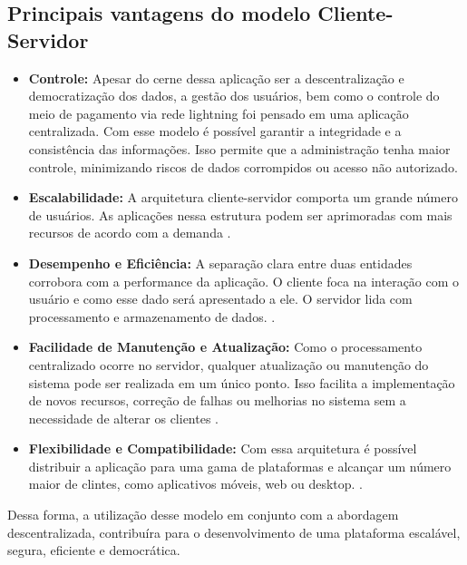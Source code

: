 \subsection{Principais vantagens do modelo Cliente-Servidor}

\begin{itemize}
    \item \textbf{Controle:} Apesar do cerne dessa aplicação ser a descentralização e democratização dos dados, a gestão dos usuários, bem como o controle do meio de pagamento via rede lightning foi pensado em uma aplicação centralizada. Com esse modelo é possível garantir a integridade e a consistência das informações. 
    Isso permite que a administração tenha maior controle, minimizando riscos de dados corrompidos ou acesso não autorizado\cite{coulouris2011}.
    
    \item \textbf{Escalabilidade:} A arquitetura cliente-servidor comporta um grande número de usuários. As aplicações nessa estrutura podem ser aprimoradas com mais recursos de acordo com a demanda \cite{coulouris2011}.
    
    \item \textbf{Desempenho e Eficiência:} A separação clara entre duas entidades corrobora com a performance da aplicação. O cliente foca na interação com o usuário e como esse dado será apresentado a ele. O servidor lida com processamento e armazenamento de dados. \cite{coulouris2011}.
    
    \item \textbf{Facilidade de Manutenção e Atualização:} Como o processamento centralizado ocorre no servidor, qualquer atualização ou manutenção do sistema pode ser realizada em um único ponto. Isso facilita a implementação de novos recursos, correção de falhas ou melhorias no sistema sem a necessidade de alterar os clientes \cite{coulouris2011}.
    
    \item \textbf{Flexibilidade e Compatibilidade:} Com essa arquitetura é possível distribuir a aplicação para uma gama de plataformas e alcançar um número maior de clintes, como aplicativos móveis, web ou desktop. \cite{coulouris2011}.
    
\end{itemize}

Dessa forma, a utilização desse modelo em conjunto com a abordagem descentralizada, contribuíra para o desenvolvimento de uma plataforma escalável, segura, eficiente e democrática.

